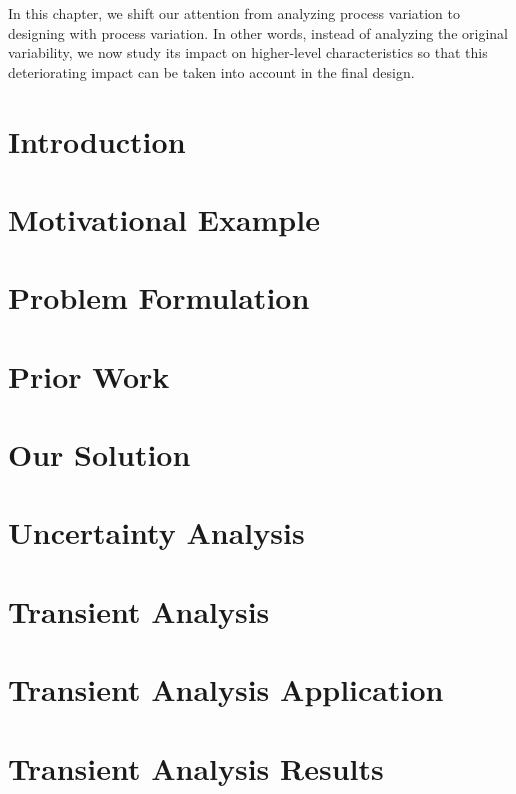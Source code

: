 In this chapter, we shift our attention from analyzing process variation to
designing with process variation. In other words, instead of analyzing the
original variability, we now study its impact on higher-level characteristics so
that this deteriorating impact can be taken into account in the final design.

\section{Introduction}

\section{Motivational Example}

\section{Problem Formulation}

\section{Prior Work}

\section{Our Solution}

\section{Uncertainty Analysis}

\section{Transient Analysis}

\section{Transient Analysis Application}

\section{Transient Analysis Results}

